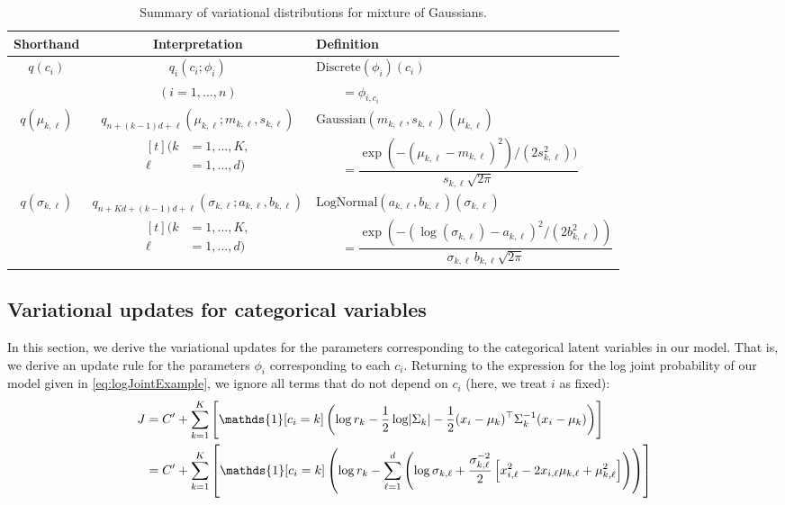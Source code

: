 \documentclass[11pt]{article}
\newcommand{\Discrete}{\mathrm{Discrete}}
\newcommand{\Gaussian}{\mathrm{Gaussian}}
\newcommand{\LogNormal}{\mathrm{LogNormal}}
\begin{document}
\begin{table}[h!]
\caption{Summary of variational distributions for mixture of Gaussians.}
\label{table:varDists}
\centering
\bgroup
\def\arraystretch{1.5}%
\begin{tabular}{c|c|l}
Shorthand & Interpretation & Definition \\ \hline
%
$q(c_i)$
& $q_i(c_i; \phi_i)$
& $\Discrete(\phi_i)(c_i)$ \\
& $(i = 1, \ldots, n)$
& $\qquad= \phi_{i,c_i}$ \\ \hline
%
$q(\mu_{k,\ell})$
& $q_{n+(k-1)d+\ell}(\mu_{k, \ell}; m_{k,\ell}, s_{k,\ell})$
& $\Gaussian(m_{k,\ell}, s_{k,\ell})(\mu_{k, \ell})$ \\
& $\begin{aligned}[t](k &= 1, \ldots, K, \\ \ell &= 1, \ldots, d) \end{aligned}$
& $\qquad= \dfrac{\exp(-(\mu_{k,\ell}-m_{k,\ell})^2) / (2 s_{k,\ell}^2) )}{s_{k,\ell} \sqrt{2\pi}}$ \\ \hline
%
$q(\sigma_{k,\ell})$
& $q_{n+Kd+(k-1)d+\ell}(\sigma_{k,\ell}; a_{k,\ell}, b_{k,\ell})$
& $\LogNormal(a_{k,\ell}, b_{k,\ell})(\sigma_{k,\ell})$ \\
& $\begin{aligned}[t](k &= 1, \ldots, K, \\ \ell &= 1, \ldots, d) \end{aligned}$
& $\qquad= \dfrac{\exp(-(\log(\sigma_{k,\ell})-a_{k,\ell})^2 / (2 b_{k,\ell}^2))} {\sigma_{k,\ell} \, b_{k,\ell} \sqrt{2\pi}}$ \\
\end{tabular}
\egroup
\end{table}

\subsection{Variational updates for categorical variables}

In this section, we derive the variational updates for the parameters corresponding to the categorical latent variables in our model.
That is, we derive an update rule for the parameters $\phi_i$ corresponding to each $c_i$.
Returning to the expression for the log joint probability of our model given in \eqref{eq:logJointExample}, we ignore all terms that do not depend on $c_i$ (here, we treat $i$ as fixed):
\begin{align}
J
&= C' + \sum_{k=1}^K \left[ \mathds{1}[c_i = k] \left( \log r_k - \frac{1}{2} \log \abs{ \Sigma_k } - \frac{1}{2} (x_i - \mu_k)^\top \Sigma_k^{-1} (x_i - \mu_k) \right) \right] \\
&= C' + \sum_{k=1}^K \left[ \mathds{1}[c_i = k] \left( \log r_k - \sum_{\ell=1}^d \left(
    \log \sigma_{k, \ell} + \frac{\sigma_{k, \ell}^{-2}}{2}
        \left[
            x_{i,\ell}^2 - 2 x_{i,\ell} \mu_{k,\ell} + \mu_{k,\ell}^2
        \right]
    \right) \right) \right]
\end{align}
\end{document}
